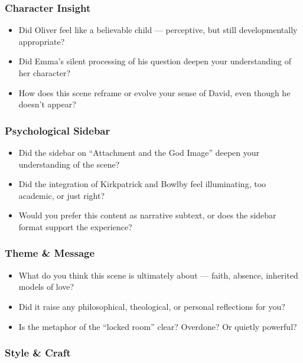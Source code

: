 \subsubsection*{Character Insight}

\begin{itemize}
  \item Did Oliver feel like a believable child — perceptive, but still developmentally appropriate?
  \item Did Emma’s silent processing of his question deepen your understanding of her character?
  \item How does this scene reframe or evolve your sense of David, even though he doesn’t appear?
\end{itemize}

\subsubsection*{Psychological Sidebar}

\begin{itemize}
  \item Did the sidebar on ``Attachment and the God Image'' deepen your understanding of the scene?
  \item Did the integration of Kirkpatrick and Bowlby feel illuminating, too academic, or just right?
  \item Would you prefer this content as narrative subtext, or does the sidebar format support the experience?
\end{itemize}

\subsubsection*{Theme \& Message}

\begin{itemize}
  \item What do you think this scene is ultimately about — faith, absence, inherited models of love?
  \item Did it raise any philosophical, theological, or personal reflections for you?
  \item Is the metaphor of the ``locked room'' clear? Overdone? Or quietly powerful?
\end{itemize}

\subsubsection*{Style \& Craft}

